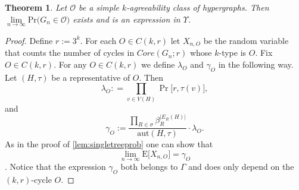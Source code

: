 \documentclass[12pt,notitlepage,a4paper]{article}
\newtheorem{theorem}{Theorem}[section]
\theoremstyle{definition}
\newcommand{\N}{\mathbb{N}}
\newcommand{\Ln}{\lim\limits_{n\to \infty}}
\newcommand{\PR}[1]{\mathrm{Pr}\big(#1\big)}
\newcommand{\aut}{\mathrm{aut}}
\begin{document}
\begin{theorem}\label{thm:agreeabilityprobabilities}
	Let $\mathcal{O}$ be a simple $k$-agreeability class
	of hypergraphs. Then 
	$\Ln \PR{G_n\in \mathcal{O}}$ exists and is an expression
	in $\Upsilon$. 
\end{theorem}
\begin{proof}
	Define $r:=3^k$. 
	For each $O\in C(k,r)$ let $X_{n,O}$ be the random variable
	that counts the number of cycles in $Core(G_n;r)$ 
	whose $k$-type is $O$. Fix $O\in C(k,r)$.
	For any $O\in C(k,r)$ we define $\lambda_O$ and 
	$\gamma_O$ in the following way. Let $(H,\tau)$ be
	a representative of $O$. Then
	\[ 
	\lambda_O:
	=\prod_{v\in V(H)}
	\Pr \big[ r, \tau(v) \big],
	\]
	and
	\[
	\gamma_O:=
	\frac{\prod_{R\in \sigma} \beta_R^{|E_R(H)|}}
	{\aut(H,\tau)}\cdot\lambda_O.
	\]	
	As in the proof of 
	\cref{lem:singletreeprob} one can show that
	\[
	\Ln \mathrm{E}\big[ X_{n,O}\big]
	= \gamma_O
	\].
	Notice that the expression $\gamma_O$ both belongs to $\Gamma$ and
	does only depend on the $(k,r)$-cycle $O$. \par
	

\end{proof}
\end{document}
